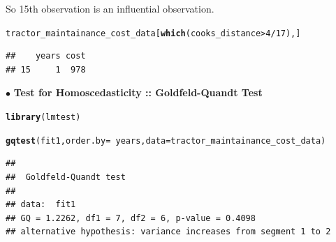 \documentclass[10pt, a4paper]{article}\usepackage[]{graphicx}\usepackage[]{xcolor}
\makeatletter
\newcommand{\hlnum}[1]{\textcolor[rgb]{0.686,0.059,0.569}{#1}}%
\newcommand{\hlopt}[1]{\textcolor[rgb]{0,0,0}{#1}}%
\newcommand{\hlstd}[1]{\textcolor[rgb]{0.345,0.345,0.345}{#1}}%
\newcommand{\hlkwc}[1]{\textcolor[rgb]{0.333,0.667,0.333}{#1}}%
\newcommand{\hlkwd}[1]{\textcolor[rgb]{0.737,0.353,0.396}{\textbf{#1}}}%
\newenvironment{kframe}{%
 \def\at@end@of@kframe{}%
 \ifinner\ifhmode%
  \def\at@end@of@kframe{\end{minipage}}%
  \begin{minipage}{\columnwidth}%
 \fi\fi%
 \def\FrameCommand##1{\hskip\@totalleftmargin \hskip-\fboxsep
 \colorbox{shadecolor}{##1}\hskip-\fboxsep
     \hskip-\linewidth \hskip-\@totalleftmargin \hskip\columnwidth}%
 \MakeFramed {\advance\hsize-\width
   \@totalleftmargin\z@ \linewidth\hsize
   \@setminipage}}%
 {\par\unskip\endMakeFramed%
 \at@end@of@kframe}
\newenvironment{knitrout}{}{} %
\makeatother
\begin{document}
So 15th observation is an influential observation.

\begin{knitrout}
\color{fgcolor}\begin{kframe}
\begin{alltt}
\hlstd{tractor_maintainance_cost_data[}\hlkwd{which}\hlstd{(cooks_distance} \hlopt{>} \hlnum{4}\hlopt{/}\hlnum{17}\hlstd{), ]}
\end{alltt}
\begin{verbatim}
##    years cost
## 15     1  978
\end{verbatim}
\end{kframe}
\end{knitrout}


\newpage

$\bullet$ \textbf{Test for Homoscedasticity :: Goldfeld-Quandt Test}

\begin{knitrout}
\color{fgcolor}\begin{kframe}
\begin{alltt}
\hlkwd{library}\hlstd{(lmtest)}
\end{alltt}


{\ttfamily\noindent\color{warningcolor}{\#\# Warning: package 'lmtest' was built under R version 4.2.3}}

{\ttfamily\noindent\itshape\color{messagecolor}{\#\# Loading required package: zoo}}

{\ttfamily\noindent\itshape\color{messagecolor}{\#\# \\\#\# Attaching package: 'zoo'}}

{\ttfamily\noindent\itshape\color{messagecolor}{\#\# The following objects are masked from 'package:base':\\\#\# \\\#\# \ \ \ \ as.Date, as.Date.numeric}}\end{kframe}
\end{knitrout}

\begin{knitrout}
\color{fgcolor}\begin{kframe}
\begin{alltt}
\hlkwd{gqtest}\hlstd{(fit1,} \hlkwc{order.by} \hlstd{=} \hlopt{~}\hlstd{years,} \hlkwc{data} \hlstd{= tractor_maintainance_cost_data)}
\end{alltt}
\begin{verbatim}
## 
## 	Goldfeld-Quandt test
## 
## data:  fit1
## GQ = 1.2262, df1 = 7, df2 = 6, p-value = 0.4098
## alternative hypothesis: variance increases from segment 1 to 2
\end{verbatim}
\end{kframe}
\end{knitrout}
\end{document}
